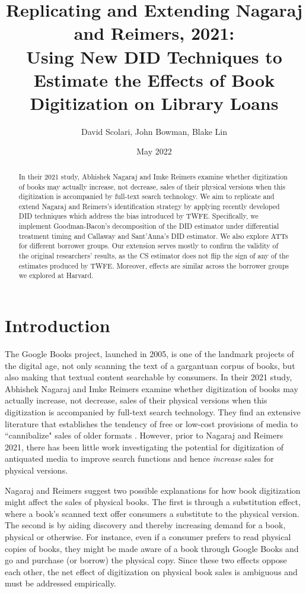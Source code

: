 \documentclass{article}
\author{David Scolari, John Bowman, Blake Lin}
\title{Replicating and Extending Nagaraj and Reimers, 2021: \\
Using New DID Techniques to Estimate the Effects of Book Digitization on Library Loans}
\date{May 2022}
\begin{document}
\maketitle

\begin{abstract}
In their 2021 study, Abhishek Nagaraj and Imke Reimers examine whether digitization of books may actually increase, not decrease, sales of their physical versions when this digitization is accompanied by full-text search technology. We aim to replicate and extend Nagaraj and Reimers’s identification strategy by applying recently developed DID techniques which address the bias introduced by TWFE. Specifically, we implement Goodman-Bacon’s decomposition of the DID estimator under differential treatment timing and Callaway and Sant’Anna’s DID estimator. We also explore ATTs for different borrower groups. Our extension serves mostly to confirm the validity of the original researchers’ results, as the CS estimator does not flip the sign of any of the estimates produced by TWFE. Moreover, effects are similar across the borrower groups  we explored at Harvard.
\end{abstract}

\section{Introduction}
The Google Books project, launched in 2005, is one of the landmark projects of the digital age, not only scanning the text of a gargantuan corpus of books, but also making that textual content searchable by consumers. In their 2021 study, Abhishek Nagaraj and Imke Reimers examine whether digitization of books may actually increase, not decrease, sales of their physical versions when this digitization is accompanied by full-text search technology. They find an extensive literature that establishes the tendency of free or low-cost provisions of media to ``cannibalize" sales of older formats \cite{nagaraj2021digitization}. However, prior to Nagaraj and Reimers 2021, there has been little work investigating the potential for digitization of antiquated media to improve search functions and hence \textit{increase} sales for physical versions. 

Nagaraj and Reimers  suggest two possible explanations for how book digitization might affect the sales of physical books. The first is through a substitution effect, where a book's scanned text offer consumers a substitute to the physical version. The second is by aiding discovery and thereby increasing demand for a book, physical or otherwise. For instance, even if a consumer prefers to read physical copies of books, they might be made aware of a book through Google Books and go and purchase (or borrow) the physical copy. Since these two effects oppose each other, the net effect of digitization on physical book sales is ambiguous and must be addressed empirically.
\end{document}
